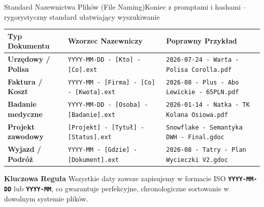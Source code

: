 \documentclass[aspectratio=169, 10pt]{beamer}
\begin{document}

\begin{frame}{Standard Nazewnictwa Plików (File Naming)}{Koniec z promptami i hashami -- rygorystyczny standard ułatwiający wyszukiwanie}
  \begin{center}
    \small
    \begin{tabularx}{\textwidth}{p{3.2cm}p{4.5cm}X}
      \toprule
      \textbf{Typ Dokumentu} & \textbf{Wzorzec Nazewniczy} & \textbf{Poprawny Przykład} \\
      \midrule
      \textbf{Urzędowy / Polisa} & \texttt{YYYY-MM-DD - [Kto] - [Co].ext} & \texttt{2026-07-24 - Warta - Polisa Corolla.pdf} \\
      \addlinespace
      \textbf{Faktura / Koszt} & \texttt{YYYY-MM - [Firma] - [Co] - [Kwota].ext} & \texttt{2026-08 - Plus - Abo Lewickie - 65PLN.pdf} \\
      \addlinespace
      \textbf{Badanie medyczne} & \texttt{YYYY-MM-DD - [Osoba] - [Badanie].ext} & \texttt{2026-01-14 - Natka - TK Kolana Osiowa.pdf} \\
      \addlinespace
      \textbf{Projekt zawodowy} & \texttt{[Projekt] - [Tytuł] - [Status].ext} & \texttt{Snowflake - Semantyka DWH - Final.gdoc} \\
      \addlinespace
      \textbf{Wyjazd / Podróż} & \texttt{YYYY-MM - [Gdzie] - [Dokument].ext} & \texttt{2026-08 - Tatry - Plan Wycieczki V2.gdoc} \\
      \bottomrule
    \end{tabularx}
  \end{center}

  \vspace{0.2cm}
  \begin{alertblock}{\textbf{Kluczowa Reguła}}
    \footnotesize
    Wszystkie daty zawsze zapisujemy w formacie ISO \textbf{\texttt{YYYY-MM-DD}} lub \textbf{\texttt{YYYY-MM}}, co gwarantuje perfekcyjne, chronologiczne sortowanie w dowolnym systemie plików.
  \end{alertblock}
\end{frame}
\end{document}
